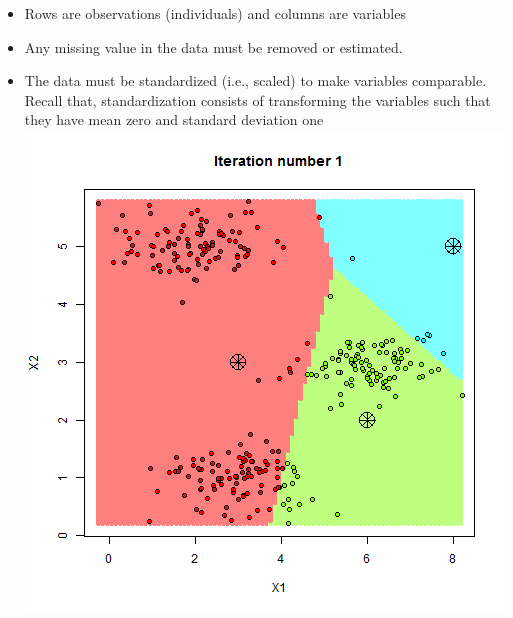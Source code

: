 \documentclass[
]{article}
\newenvironment{Shaded}{\begin{snugshade}}{\end{snugshade}}
\newcommand{\DataTypeTok}[1]{\textcolor[rgb]{0.13,0.29,0.53}{#1}}
\newcommand{\KeywordTok}[1]{\textcolor[rgb]{0.13,0.29,0.53}{\textbf{#1}}}
\newcommand{\NormalTok}[1]{#1}
\newcommand{\StringTok}[1]{\textcolor[rgb]{0.31,0.60,0.02}{#1}}
\providecommand{\tightlist}{%
  \setlength{\itemsep}{0pt}\setlength{\parskip}{0pt}}
\begin{document}
\begin{itemize}
\tightlist
\item
  Rows are observations (individuals) and columns are variables
\item
  Any missing value in the data must be removed or estimated.
\item
  The data must be standardized (i.e., scaled) to make variables
  comparable. Recall that, standardization consists of transforming the
  variables such that they have mean zero and standard deviation one
  \includegraphics{k-means.gif}
\end{itemize}

\begin{Shaded}
\end{Shaded}
\end{document}
